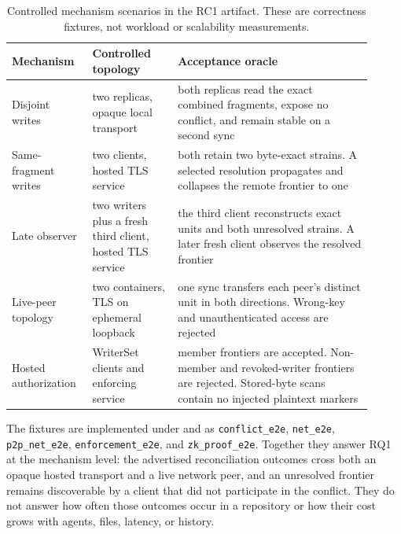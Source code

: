 \begin{table}[t]
  \centering
  \small
  \setlength{\tabcolsep}{4pt}
  \caption{Controlled mechanism scenarios in the RC1 artifact.  These are
  correctness fixtures, not workload or scalability measurements.}
  \label{tab:mechanism-evidence}
  \begin{tabular}{@{}p{0.19\linewidth}p{0.22\linewidth}p{0.50\linewidth}@{}}
    \toprule
    Mechanism & Controlled topology & Acceptance oracle \\
    \midrule
    Disjoint writes &
      two replicas, opaque local transport &
      both replicas read the exact combined fragments, expose no conflict, and
      remain stable on a second sync \\
    Same-fragment writes &
      two clients, hosted TLS service &
      both retain two byte-exact strains. A selected resolution propagates and
      collapses the remote frontier to one \\
    Late observer &
      two writers plus a fresh third client, hosted TLS service &
      the third client reconstructs exact units and both unresolved strains.
      A later fresh client observes the resolved frontier \\
    Live-peer topology &
      two containers, TLS on ephemeral loopback &
      one sync transfers each peer's distinct unit in both directions.
      Wrong-key and unauthenticated access are rejected \\
    Hosted authorization &
      WriterSet clients and enforcing service &
      member frontiers are accepted. Non-member and revoked-writer frontiers
      are rejected. Stored-byte scans contain no injected plaintext markers \\
    \bottomrule
  \end{tabular}
\end{table}

The fixtures are implemented under  and
 as
\texttt{conflict\_e2e}, \texttt{net\_e2e},
\texttt{p2p\_net\_e2e}, \texttt{enforcement\_e2e}, and
\texttt{zk\_proof\_e2e}.  Together they answer RQ1 at the mechanism level:
the advertised reconciliation outcomes cross both an opaque hosted transport
and a live network peer, and an unresolved frontier remains discoverable by a
client that did not participate in the conflict.  They do not answer how often
those outcomes occur in a repository or how their cost grows with agents,
files, latency, or history.

